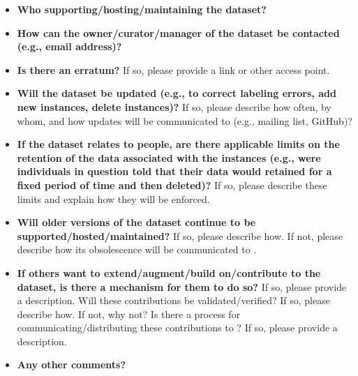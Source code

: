 \begin{itemize}

\item \textbf{Who  supporting/hosting/maintaining the dataset?}

\item \textbf{How can the owner/curator/manager of the dataset be contacted (e.g., email address)?}

\item \textbf{Is there an erratum?} If so, please provide a link or other access point.

\item \textbf{Will the dataset be updated (e.g., to correct labeling
    errors, add new instances, delete instances)?} If so, please
  describe how often, by whom, and how updates will be communicated to
   (e.g., mailing list, GitHub)?

\item \textbf{If the dataset relates to people, are there applicable
    limits on the retention of the data associated with the instances
    (e.g., were  individuals in question told that their data would
     retained for a fixed period of time and then deleted)?} If so,
    please describe these limits and explain how they will be
    enforced.

\item \textbf{Will older versions of the dataset continue to be
    supported/hosted/maintained?} If so, please describe how. If not,
  please describe how its obsolescence will be communicated to .

\item \textbf{If others want to extend/augment/build on/contribute to
    the dataset, is there a mechanism for them to do so?} If so,
  please provide a description. Will these contributions be
  validated/verified? If so, please describe how. If not, why not? Is
  there a process for communicating/distributing these contributions
  to ? If so, please provide a description.

\item \textbf{Any other comments?}

\end{itemize}

